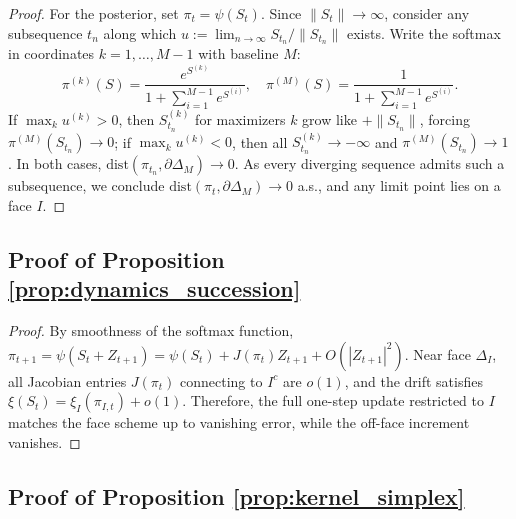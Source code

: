 \documentclass[12pt]{article}
\begin{document}
\begin{proof}
    For the posterior, set $\pi_t=\psi(S_t)$.
    Since $\|S_t\|\to\infty$, consider any subsequence $t_n$ along which $u:=\lim_{n\to\infty} S_{t_n}/\|S_{t_n}\|$ exists.
    Write the softmax in coordinates $k=1,\dots,M-1$ with baseline $M$:
    \[
    \pi^{(k)}(S)=\frac{e^{S^{(k)}}}{1+\sum_{i=1}^{M-1} e^{S^{(i)}}},\quad
    \pi^{(M)}(S)=\frac{1}{1+\sum_{i=1}^{M-1} e^{S^{(i)}}}.
    \]
    If $\max_k u^{(k)}>0$, then $S^{(k)}_{t_n}$ for maximizers $k$ grow like $+\|S_{t_n}\|$, forcing $\pi^{(M)}(S_{t_n})\to 0$; if $\max_k u^{(k)}<0$, then all $S^{(k)}_{t_n}\to -\infty$ and $\pi^{(M)}(S_{t_n})\to 1$.
    In both cases, $\mathrm{dist}(\pi_{t_n},\partial\Delta_M)\to 0$.
    As every diverging sequence admits such a subsequence, we conclude $\mathrm{dist}(\pi_t,\partial\Delta_M)\to 0$ a.s., and any limit point lies on a face $I$.
    \end{proof}
    
\subsection{Proof of Proposition \ref{prop:dynamics_succession}}


\begin{proof}
By smoothness of the softmax function, \(\pi_{t+1}=\psi(S_t+Z_{t+1})=\psi(S_t)+J(\pi_t)Z_{t+1}+O(|Z_{t+1}|^2)\). Near face \(\Delta_I\), all Jacobian entries \(J(\pi_t)\) connecting to \(I^c\) are \(o(1)\), and the drift satisfies \(\xi(S_t)=\xi_I(\pi_{I,t})+o(1)\). Therefore, the full one-step update restricted to \(I\) matches the face scheme up to vanishing error, while the off-face increment vanishes.
\end{proof}


\subsection{Proof of Proposition \ref{prop:kernel_simplex}}
\end{document}
